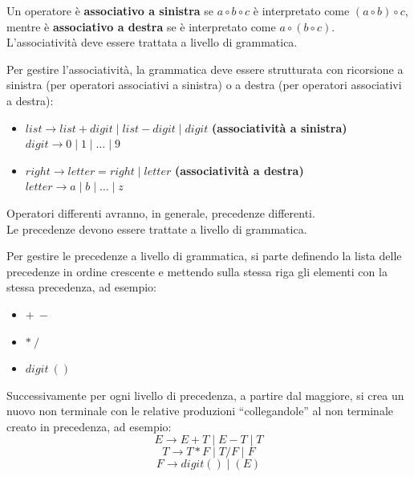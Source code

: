 \documentclass[12pt]{article}
\begin{document}
\bigskip
\begin{definition}[Associatività]
Un operatore è \textbf{associativo a sinistra} se $a \circ b \circ c$ è interpretato come $(a \circ b) \circ c$, mentre è \textbf{associativo a destra} se è interpretato come $a \circ (b \circ c)$.\\
L'associatività deve essere trattata a livello di grammatica.
\end{definition}
\noindent Per gestire l'associatività, la grammatica deve essere strutturata con ricorsione a sinistra (per operatori associativi a sinistra) o a destra (per operatori associativi a destra):
\begin{itemize}
    \item $list \to list + digit \mid list - digit \mid digit$ \textbf{(associatività a sinistra)}\\
        $digit \to 0 \mid 1 \mid \dots \mid 9$
    \item $right \to letter = right \mid letter$ \textbf{(associatività a destra)}\\
        $letter \to a \mid b \mid \dots \mid z$
\end{itemize}
\begin{definition}[Precedenza]
Operatori differenti avranno, in generale, precedenze differenti.\\
Le precedenze devono essere trattate a livello di grammatica.
\end{definition}
\noindent Per gestire le precedenze a livello di grammatica, si parte definendo la lista delle precedenze in ordine crescente e mettendo sulla stessa riga gli elementi con la stessa precedenza, ad esempio:
\begin{itemize}
    \item $+ \ -$
    \item $* \ /$
    \item $digit \ ()$
\end{itemize}
Successivamente per ogni livello di precedenza, a partire dal maggiore, si crea un nuovo non terminale con le relative produzioni ``collegandole'' al non terminale creato in precedenza, ad esempio:
$$E \to E + T \mid E - T \mid T$$
$$T \to T * F \mid T / F \mid F$$
$$F \to digit() \mid (E)$$
\end{document}
